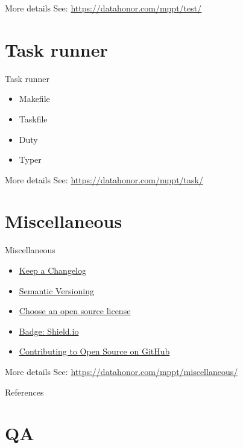 \documentclass{ctexbeamer}
\begin{document}
\begin{frame}{More details}
    See: \href{https://datahonor.com/mppt/test/}{https://datahonor.com/mppt/test/}
\end{frame}

\section{Task runner}
\begin{frame}{Task runner}
    \begin{itemize}
        \item Makefile
        \item Taskfile
        \item Duty
        \item Typer
    \end{itemize}
\end{frame}

\begin{frame}{More details}
    See: \href{https://datahonor.com/mppt/task/}{https://datahonor.com/mppt/task/}
\end{frame}

\section{Miscellaneous}
\begin{frame}{Miscellaneous}
    \begin{itemize}
        \item \href{https://keepachangelog.com/en/1.1.0/}{Keep a Changelog}
        \item \href{https://semver.org/}{Semantic Versioning}
        \item \href{https://choosealicense.com/}{Choose an open source license}
        \item \href{https://shields.io/}{Badge: Shield.io}
        \item \href{https://guides.github.com/activities/contributing-to-open-source/}{Contributing to Open Source on GitHub}
    \end{itemize}
\end{frame}

\begin{frame}{More details}
    See: \href{https://datahonor.com/mppt/miscellaneous/}{https://datahonor.com/mppt/miscellaneous/}
\end{frame}

\begin{frame}{References}
    \printbibliography
\end{frame}


\section{QA}
\end{document}
